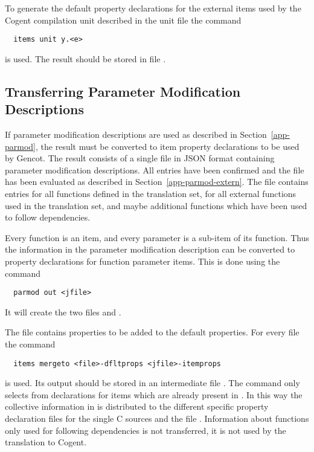 To generate the default property declarations for the external items used by the Cogent compilation unit described in the 
unit file  the command
\begin{verbatim}
  items unit y.<e>
\end{verbatim}
is used. The result should be stored in file .

\subsection{Transferring Parameter Modification Descriptions}
\label{app-items-parmod}

If parameter modification descriptions are used as described in Section~\ref{app-parmod}, the result must be converted to item
property declarations to be used by Gencot. The result consists of a single file  in JSON format containing 
parameter modification descriptions. All entries have been confirmed and the file has been evaluated as described in 
Section~\ref{app-parmod-extern}. The file contains entries for all functions defined in the translation set, for all external 
functions used in the translation set, and maybe additional functions which have been used to follow dependencies.

Every function is an item, and every parameter is a sub-item of its function. Thus the information in the parameter modification
description can be converted to property declarations for function parameter items. This is done using the command
\begin{verbatim}
  parmod out <jfile>
\end{verbatim}
It will create the two files  and . 

The file  contains properties to be added to the default properties. For every file 
the command 
\begin{verbatim}
  items mergeto <file>-dfltprops <jfile>-itemprops
\end{verbatim}
is used. Its output should be stored in an intermediate file . The command only selects from 
 declarations for items which are already present in
. In this way the collective information in  is distributed to the different
specific property declaration files for the single C sources and the file . Information about functions
only used for following dependencies is not transferred, it is not used by the translation to Cogent.

